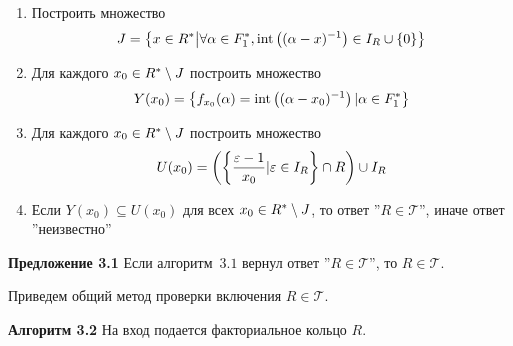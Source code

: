 \documentclass[_00_autoref.tex]{subfiles}
\begin{document}
    \begin{enumerate}
        \item Построить множество
        \begin{equation*}
            J = \left\{
                x \in R^{*} \big| \forall \alpha \in F_1^{*}, \textrm{int}\left((\alpha - x)^{-1}\right) \in I_{R} \cup \{0\}
            \right\}
        \end{equation*}
        
        \item Для каждого $x_0 \in R^{*} \setminus J$ построить множество
        \begin{equation*}
            Y(x_0) = \left\{
                f_{x_0}(\alpha) = \textrm{int}\left((\alpha - x_0)^{-1}\right) | \alpha \in F_1^{*}
            \right\}
        \end{equation*}
        
        \item Для каждого $x_0 \in R^{*} \setminus J$ построить множество
        \begin{equation*}
            U(x_0) = \left(
                \left\{
                    \frac{\varepsilon - 1}{x_0} | \varepsilon \in I_{R}
                \right\} \cap R
            \right) \cup I_{R}
        \end{equation*}
        
        \item Если $Y(x_0) \subseteq U(x_0)$ для всех $x_0 \in R^{*} \setminus J$, то ответ ''$R \in \mathcal{T}$'', иначе ответ ''неизвестно''
    \end{enumerate}

\textbf{Предложение 3.1}
    Если алгоритм~$3.1$ вернул ответ ''$R \in \mathcal{T}$'', то $R \in \mathcal{T}$.


Приведем общий метод проверки включения $R \in \mathcal{T}$.

\textbf{Алгоритм 3.2}\label{algorithm:R_in_T}
    На вход подается факториальное кольцо $R$.
    
\end{document}
